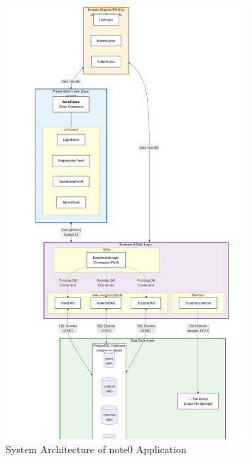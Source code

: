 \documentclass[12pt, a4paper]{report}
\begin{document}
\begin{figure}[h!]
    \centering
    \includegraphics[width=0.8\textwidth]{images/architecture.jpeg}
    \caption{System Architecture of note0 Application}
    \label{fig:architecture}
\end{figure}

\end{document}
